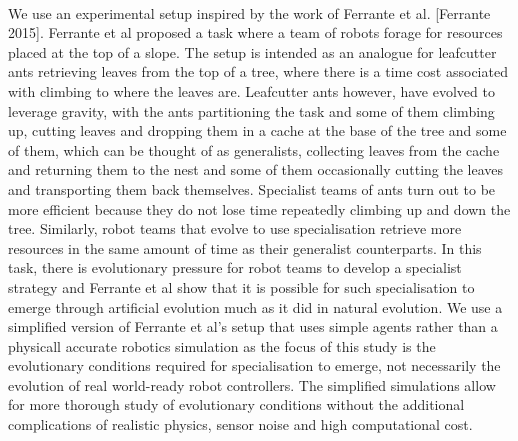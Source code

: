 \documentclass[sigconf]{aamas}  %
\begin{document}
\paragraph{}
We use an experimental setup inspired by the work of Ferrante et al. [Ferrante 2015]. Ferrante et al proposed a task where a team of robots forage for resources placed at the top of a slope. The setup is intended as an analogue for leafcutter ants retrieving leaves from the top of a tree, where there is a time cost associated with climbing to where the leaves are. Leafcutter ants however, have evolved to leverage gravity, with the ants partitioning the task and some of them climbing up, cutting leaves and dropping them in a cache at the base of the tree and some of them, which can be thought of as generalists, collecting leaves from the cache and returning them to the nest and some of them occasionally cutting the leaves and transporting them back themselves. Specialist teams of ants turn out to be more efficient because they do not lose time repeatedly climbing up and down the tree. Similarly, robot teams that evolve to use specialisation retrieve more resources in the same amount of time as their generalist counterparts. In this task, there is evolutionary pressure for robot teams to develop a specialist strategy and Ferrante et al show that it is possible for such specialisation to emerge through artificial evolution much as it did in natural evolution. We use a simplified version of Ferrante et al's setup that uses simple agents rather than a physicall accurate robotics simulation as the focus of this study is the evolutionary conditions required for specialisation to emerge, not necessarily the evolution of real world-ready robot controllers. The simplified simulations allow for more thorough study of evolutionary conditions without the additional complications of realistic physics, sensor noise and high computational cost.
\end{document}

